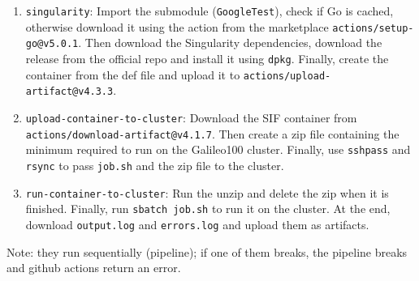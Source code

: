 \documentclass[a4paper]{article}
\begin{document}
\begin{itemize}
\begin{itemize}
\begin{enumerate}
                \item \texttt{singularity}: Import the submodule (\texttt{GoogleTest}), check if Go is cached, otherwise download it using the action from the marketplace \texttt{actions/setup-go@v5.0.1}. Then download the Singularity dependencies, download the release from the official repo and install it using \texttt{dpkg}. Finally, create the container from the def file and upload it to \texttt{actions/upload-artifact@v4.3.3}.
                
                \item \texttt{upload-container-to-cluster}: Download the SIF container from \texttt{actions/download-artifact@v4.1.7}. Then create a zip file containing the minimum required to run on the Galileo100 cluster. Finally, use \texttt{sshpass} and \texttt{rsync} to pass \texttt{job.sh} and the zip file to the cluster.
                
                \item \texttt{run-container-to-cluster}: Run the unzip and delete the zip when it is finished. Finally, run \texttt{sbatch job.sh} to run it on the cluster. At the end, download \texttt{output.log} and \texttt{errors.log} and upload them as artifacts.
            \end{enumerate}
            Note: they run sequentially (pipeline); if one of them breaks, the pipeline breaks and github actions return an error.
        \end{itemize}
    \end{itemize}
\end{document}
